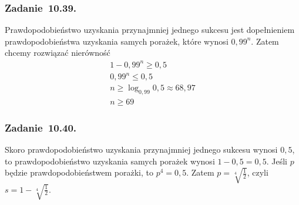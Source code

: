 \subsubsection*{Zadanie~10.39.}
Prawdopodobieństwo uzyskania przynajmniej jednego sukcesu jest dopełnieniem prawdopodobieństwa uzyskania samych porażek, które wynosi \(0{,}99^n\). Zatem chcemy rozwiązać nierówność
\begin{gather*}
    1 - 0{,}99^n \geq 0{,}5\\
    0{,}99^n \leq 0{,}5\\
    n \geq \log_{0{,}99}0{,}5 \approx 68{,}97\\
    n \geq 69
\end{gather*}
\subsubsection*{Zadanie~10.40.}
Skoro prawdopodobieństwo uzyskania przynajmniej jednego sukcesu wynosi \(0{,}5\), to prawdopodobieństwo uzyskania samych porażek wynosi \(1 - 0{,}5 = 0{,}5\). Jeśli \(p\) będzie prawdopodobieństwem porażki, to \(p^4 = 0{,}5\). Zatem \(p = \sqrt[4]{\frac{1}{2}}\), czyli \(s = 1 - \sqrt[4]{\frac{1}{2}}\).
